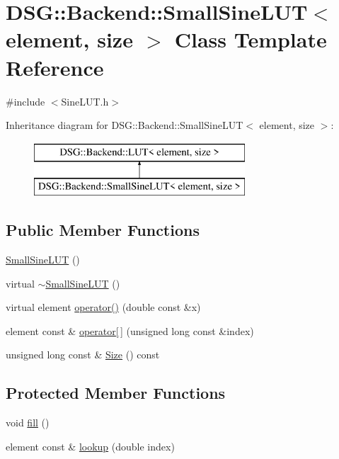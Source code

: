 \hypertarget{classDSG_1_1Backend_1_1SmallSineLUT}{\section{D\+S\+G\+:\+:Backend\+:\+:Small\+Sine\+L\+U\+T$<$ element, size $>$ Class Template Reference}
\label{classDSG_1_1Backend_1_1SmallSineLUT}
}


{\ttfamily \#include $<$Sine\+L\+U\+T.\+h$>$}

Inheritance diagram for D\+S\+G\+:\+:Backend\+:\+:Small\+Sine\+L\+U\+T$<$ element, size $>$\+:\begin{figure}[H]
\begin{center}
\leavevmode
\includegraphics[height=2.000000cm]{classDSG_1_1Backend_1_1SmallSineLUT}
\end{center}
\end{figure}
\subsection*{Public Member Functions}
\begin{DoxyCompactItemize}
\item 
\hyperlink{classDSG_1_1Backend_1_1SmallSineLUT_a2c6aac15943d6373b108336efd29cc03}{Small\+Sine\+L\+U\+T} ()
\item 
virtual \hyperlink{classDSG_1_1Backend_1_1SmallSineLUT_aa94632e333017986bb58b14a5480da52}{$\sim$\+Small\+Sine\+L\+U\+T} ()
\item 
virtual element \hyperlink{classDSG_1_1Backend_1_1SmallSineLUT_af4b947cb0760ade07b788dae2472f4c0}{operator()} (double const \&x)
\item 
element const \& \hyperlink{classDSG_1_1Backend_1_1LUT_a50d8304c33760ed566039ebf5657807c}{operator\mbox{[}$\,$\mbox{]}} (unsigned long const \&index)
\item 
unsigned long const \& \hyperlink{classDSG_1_1Backend_1_1LUT_a988c07b5002e0aee6e490244b80c8830}{Size} () const 
\end{DoxyCompactItemize}
\subsection*{Protected Member Functions}
\begin{DoxyCompactItemize}
\item 
void \hyperlink{classDSG_1_1Backend_1_1SmallSineLUT_a97ffb8a84efa321e6f2733e17205113a}{fill} ()
\item 
element const \& \hyperlink{classDSG_1_1Backend_1_1SmallSineLUT_a1af95a7037c3abacf58700975deecb3a}{lookup} (double index)
\end{DoxyCompactItemize}
